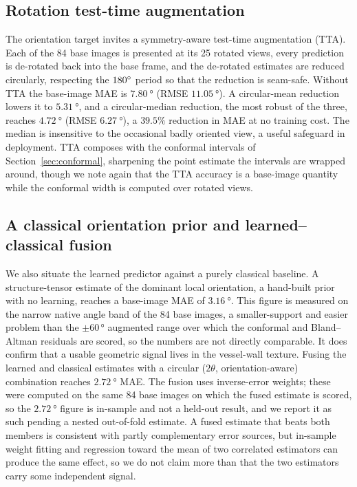 \subsection{Rotation test-time augmentation}
\label{sec:tta}

The orientation target invites a symmetry-aware test-time augmentation (TTA). Each of the 84 base images is presented at its 25 rotated views, every prediction is de-rotated back into the base frame, and the de-rotated estimates are reduced circularly, respecting the $180^\circ$ period so that the reduction is seam-safe. Without TTA the base-image MAE is $\SI{7.80}{\degree}$ (RMSE $\SI{11.05}{\degree}$). A circular-mean reduction lowers it to $\SI{5.31}{\degree}$, and a circular-median reduction, the most robust of the three, reaches $\SI{4.72}{\degree}$ (RMSE $\SI{6.27}{\degree}$), a $39.5\%$ reduction in MAE at no training cost. The median is insensitive to the occasional badly oriented view, a useful safeguard in deployment. TTA composes with the conformal intervals of Section~\ref{sec:conformal}, sharpening the point estimate the intervals are wrapped around, though we note again that the TTA accuracy is a base-image quantity while the conformal width is computed over rotated views.

\subsection{A classical orientation prior and learned--classical fusion}
\label{sec:fusion}

We also situate the learned predictor against a purely classical baseline. A structure-tensor estimate of the dominant local orientation, a hand-built prior with no learning, reaches a base-image MAE of $\SI{3.16}{\degree}$. This figure is measured on the narrow native angle band of the 84 base images, a smaller-support and easier problem than the $\pm\num{60}\,\si{\degree}$ augmented range over which the conformal and Bland--Altman residuals are scored, so the numbers are not directly comparable. It does confirm that a usable geometric signal lives in the vessel-wall texture. Fusing the learned and classical estimates with a circular ($2\theta$, orientation-aware) combination reaches $\SI{2.72}{\degree}$ MAE. The fusion uses inverse-error weights; these were computed on the same 84 base images on which the fused estimate is scored, so the $\SI{2.72}{\degree}$ figure is in-sample and not a held-out result, and we report it as such pending a nested out-of-fold estimate. A fused estimate that beats both members is consistent with partly complementary error sources, but in-sample weight fitting and regression toward the mean of two correlated estimators can produce the same effect, so we do not claim more than that the two estimators carry some independent signal.

